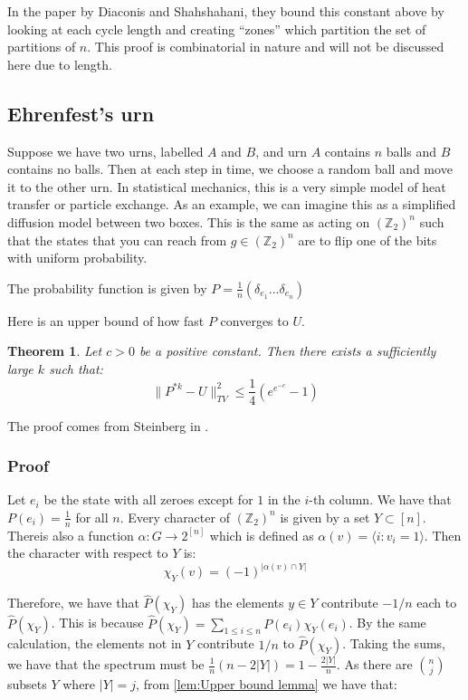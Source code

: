 \documentclass[]{article}
\newtheorem{theorem}{Theorem}
\theoremstyle{definition}
\numberwithin{theorem}{section}
\numberwithin{equation}{section}
\begin{document}
In the paper by Diaconis and Shahshahani\cite{diaconisGeneratingRandomPermutation1981}, they bound this constant above by looking at each cycle length and creating ``zones'' which partition the set of partitions of $n$. This proof is combinatorial in nature and will not be discussed here due to length. 
\subsection{Ehrenfest's urn}
Suppose we have two urns, labelled $A$ and $B$, and urn $A$ contains $n$ balls and $B$ contains no balls. Then at each step in time, we choose a random ball and move it to the other urn. In statistical mechanics, this is a very simple model of heat transfer or particle exchange. As an example, we can imagine this as a simplified diffusion model between two boxes. This is the same as acting on $(\mathbb{Z}_2)^n$ such that the states that you can reach from $g \in (\mathbb{Z}_2)^n$ are to flip one of the bits with uniform probability. 

The probability function is given by $P = \frac{1}{n} \left(\delta_{e_1} ... \delta_{e_n}\right)$

Here is an upper bound of how fast $P$ converges to $U$. 
\begin{theorem}
	Let $c > 0$ be a positive constant. Then there exists a sufficiently large $k$ such that:
	\begin{equation}
		\|P^{\ast k} - U\|^2_{TV} \leq \frac{1}{4} (e^{e^{-c}} - 1)
	\end{equation}
\end{theorem}
The proof comes from Steinberg in \cite{steinbergProbabilityRandomWalks2012}. 

\subsubsection{Proof}
Let $e_i$ be the state with all zeroes except for $1$ in the $i$-th column. We have that $P(e_i) = \frac{1}{n}$ for all $n$. 
Every character of $\left(\mathbb{Z}_2\right)^n$ is given by a set $Y \subset [n]$. Thereis also a function $\alpha: G \rightarrow 2^{[n]}$ which is defined as $\alpha(v) = \langle i : v_i = 1 \rangle$. Then the character with respect to $Y$ is:
\begin{equation}
	\chi_Y(v) = (-1)^{|\alpha(v) \cap Y|}
\end{equation}

Therefore, we have that $\widehat{P}(\chi_Y)$ has the elements $y \in Y$ contribute $ -1/n$ each to $\widehat{P}(\chi_Y)$. This is because $\widehat{P}(\chi_Y) = \sum_{1 \leq i \leq n} P(e_i) \chi_Y(e_i)$. By the same calculation, the elements not in $Y$ contribute $1/n$ to $\widehat{P}(\chi_Y)$. Taking the sums, we have that the spectrum must be $\frac{1}{n}(n - 2 |Y|) = 1 - \frac{2|Y|}{n}$. As there are $\binom{n}{j}$ subsets $Y$ where $|Y| = j$,
from \cref{lem:Upper bound lemma} we have that:
\end{document}
